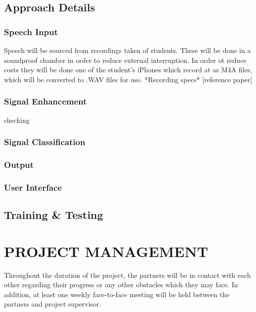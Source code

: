 \documentclass[10pt,twocolumn]{witseiepaper}
\begin{document}
\subsection{Approach Details}
\subsubsection{Speech Input}
Speech will be sourced from recordings taken of students. These will be done in a soundproof chamber in order to reduce external interruption. In order ot reduce costs they will be done one of the student's iPhones which record at as M4A files, which will be converted to .WAV files for use. *Recording specs* [reference paper]

\subsubsection{Signal Enhancement}
checking
\subsubsection{Signal Classification}



\subsubsection{Output}

\subsubsection{User Interface}

\subsection{Training \& Testing}



\section{PROJECT MANAGEMENT} %
Throughout the duration of the project, the partners will be in contact with each other regarding their progress or any other obstacles which they may face. In addition, at least one weekly face-to-face meeting will be held between the partners and project supervisor.
\end{document}
